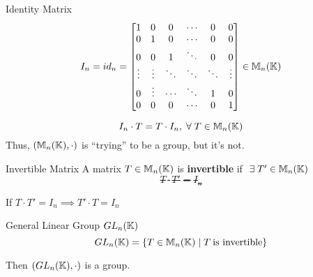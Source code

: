 \begin{definition} {Identity Matrix}
    \[
        I_n = id_n = 
            \begin{bmatrix}
                1      & 0      & 0      & \cdots & 0      & 0      \\
                0      & 1      & 0      & \cdots & 0      & 0      \\
                0      & 0      & 1      & \ddots & 0      & 0      \\
                \vdots & \vdots & \ddots & \ddots & \ddots & \vdots \\
                0      & \vdots & \cdots & \ddots & 1      & 0      \\
                0      & 0      & 0      & \cdots & 0      & 1      \\
            \end{bmatrix}
            \in \mathbb{M}_n(\mathbb{K})
    \]
\end{definition}

\begin{observe}
    \[
        I_n \cdot T = T \cdot I_n, \forall T \in \bbm_n(\bbk)
    \]
    Thus, \((\mathbb{M}_n(\mathbb{K}), \cdot)\) is ``trying'' to be a group, but it's not.
\end{observe}

\begin{definition} {Invertible Matrix}
    A matrix \(T \in \mathbb{M}_n(\mathbb{K})\) is \textbf{invertible} if \(\exists T' \in \bbm_n(\bbk)\) \st \[T \cdot T' = I_n\]
\end{definition}
\begin{exercise}
    If \(T \cdot T' = I_n \implies T' \cdot T = I_n\)
\end{exercise}

\begin{definition} {General Linear Group \(GL_n(\mathbb{K})\)}
    \[GL_n(\mathbb{K}) = \{T\in \mathbb{M}_n(\mathbb{K}) \mid T \:\text{is invertible}\}\]
\end{definition}

\begin{remark}
    Then \((GL_n(\mathbb{K}), \cdot)\) is a group.
\end{remark}

